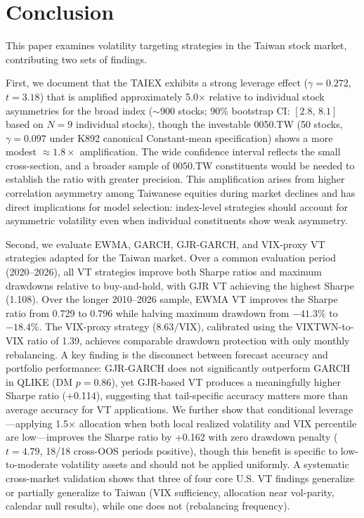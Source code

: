 
\section{Conclusion}
\label{sec:conclusion}

This paper examines volatility targeting strategies in the Taiwan stock market, contributing two sets of findings.

First, we document that the TAIEX exhibits a strong leverage effect ($\gamma = 0.272$, $t = 3.18$) that is amplified approximately 5.0$\times$ relative to individual stock asymmetries for the broad index ($\sim$900 stocks; 90\% bootstrap CI: $[2.8, \, 8.1]$ based on $N = 9$ individual stocks), though the investable 0050.TW (50 stocks, $\gamma = 0.097$ under K892 canonical Constant-mean specification) shows a more modest $\approx 1.8\times$ amplification. The wide confidence interval reflects the small cross-section, and a broader sample of 0050.TW constituents would be needed to establish the ratio with greater precision. This amplification arises from higher correlation asymmetry among Taiwanese equities during market declines and has direct implications for model selection: index-level strategies should account for asymmetric volatility even when individual constituents show weak asymmetry.

Second, we evaluate EWMA, GARCH, GJR-GARCH, and VIX-proxy VT strategies adapted for the Taiwan market. Over a common evaluation period (2020--2026), all VT strategies improve both Sharpe ratios and maximum drawdowns relative to buy-and-hold, with GJR VT achieving the highest Sharpe (1.108). Over the longer 2010--2026 sample, EWMA VT improves the Sharpe ratio from 0.729 to 0.796 while halving maximum drawdown from $-41.3\%$ to $-18.4\%$. The VIX-proxy strategy ($8.63/\text{VIX}$), calibrated using the VIXTWN-to-VIX ratio of 1.39, achieves comparable drawdown protection with only monthly rebalancing. A key finding is the disconnect between forecast accuracy and portfolio performance: GJR-GARCH does not significantly outperform GARCH in QLIKE (DM $p = 0.86$), yet GJR-based VT produces a meaningfully higher Sharpe ratio (+0.114), suggesting that tail-specific accuracy matters more than average accuracy for VT applications. We further show that conditional leverage---applying 1.5$\times$ allocation when both local realized volatility and VIX percentile are low---improves the Sharpe ratio by +0.162 with zero drawdown penalty ($t = 4.79$, 18/18 cross-OOS periods positive), though this benefit is specific to low-to-moderate volatility assets and should not be applied uniformly. A systematic cross-market validation shows that three of four core U.S. VT findings generalize or partially generalize to Taiwan (VIX sufficiency, allocation near vol-parity, calendar null results), while one does not (rebalancing frequency).

